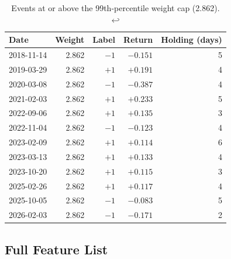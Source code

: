 \documentclass[12pt,a4paper,oneside]{article}
\begin{document}
\begin{table}[H]
\centering
\begin{tabular}{lrrrr}
\toprule
Date & Weight & Label & Return & Holding (days) \\
\midrule
2018-11-14 & 2.862 & $-1$ & $-0.151$ & 5 \\
2019-03-29 & 2.862 & $+1$ & $+0.191$ & 4 \\
2020-03-08 & 2.862 & $-1$ & $-0.387$ & 4 \\
2021-02-03 & 2.862 & $+1$ & $+0.233$ & 5 \\
2022-09-06 & 2.862 & $+1$ & $+0.135$ & 3 \\
2022-11-04 & 2.862 & $-1$ & $-0.123$ & 4 \\
2023-02-09 & 2.862 & $+1$ & $+0.114$ & 6 \\
2023-03-13 & 2.862 & $+1$ & $+0.133$ & 4 \\
2023-10-20 & 2.862 & $+1$ & $+0.115$ & 3 \\
2025-02-26 & 2.862 & $+1$ & $+0.117$ & 4 \\
2025-10-05 & 2.862 & $-1$ & $-0.083$ & 5 \\
2026-02-03 & 2.862 & $-1$ & $-0.171$ & 2 \\
\bottomrule
\end{tabular}
\caption{Events at or above the 99th-percentile weight cap (2.862). \hyperref[ref:weights_call]{$\hookleftarrow$}}
\label{tab:capped_events}
\end{table}


\subsection{Full Feature List}\label{app:features}
\end{document}
